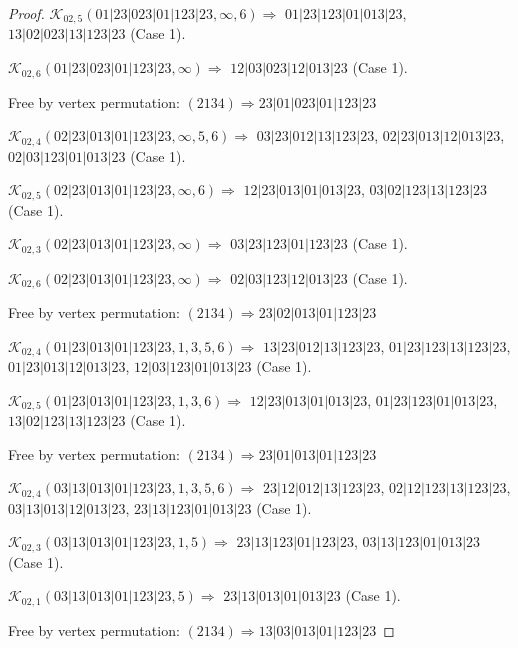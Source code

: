 \documentclass[12pt]{article}
\theoremstyle{plain}
\theoremstyle{definition}
\theoremstyle{remark}
\newcommand{\fancy}[1]{\mathcal{#1}}
\def\K{\fancy{K}}
\begin{document}
\begin{proof}
	$\K_{02,5}(01|23|023|01|123|23,\infty,6)\Rightarrow $ $01|23|123|01|013|23$, $13|02|023|13|123|23$ (Case 1).
	
	$\K_{02,6}(01|23|023|01|123|23,\infty)\Rightarrow $ $12|03|023|12|013|23$ (Case 1).
	
	
	
	Free by vertex permutation: $(2 1 3 4)\Rightarrow 23|01|023|01|123|23$
	
	
	
	\bigskip
	
	$\K_{02,4}(02|23|013|01|123|23,\infty,5, 6)\Rightarrow $ $03|23|012|13|123|23$, $02|23|013|12|013|23$, $02|03|123|01|013|23$ (Case 1).
	
	$\K_{02,5}(02|23|013|01|123|23,\infty,6)\Rightarrow $ $12|23|013|01|013|23$, $03|02|123|13|123|23$ (Case 1).
	
	$\K_{02,3}(02|23|013|01|123|23,\infty)\Rightarrow $ $03|23|123|01|123|23$ (Case 1).
	
	$\K_{02,6}(02|23|013|01|123|23,\infty)\Rightarrow $ $02|03|123|12|013|23$ (Case 1).
	
	
	
	Free by vertex permutation: $(2 1 3 4)\Rightarrow 23|02|013|01|123|23$
	
	
	
	\bigskip
	
	$\K_{02,4}(01|23|013|01|123|23,1, 3, 5, 6)\Rightarrow $ $13|23|012|13|123|23$, $01|23|123|13|123|23$, $01|23|013|12|013|23$, $12|03|123|01|013|23$ (Case 1).
	
	$\K_{02,5}(01|23|013|01|123|23,1, 3, 6)\Rightarrow $ $12|23|013|01|013|23$, $01|23|123|01|013|23$, $13|02|123|13|123|23$ (Case 1).
	
	
	
	Free by vertex permutation: $(2 1 3 4)\Rightarrow 23|01|013|01|123|23$
	
	
	
	\bigskip
	
	$\K_{02,4}(03|13|013|01|123|23,1, 3, 5, 6)\Rightarrow $ $23|12|012|13|123|23$, $02|12|123|13|123|23$, $03|13|013|12|013|23$, $23|13|123|01|013|23$ (Case 1).
	
	$\K_{02,3}(03|13|013|01|123|23,1, 5)\Rightarrow $ $23|13|123|01|123|23$, $03|13|123|01|013|23$ (Case 1).
	
	$\K_{02,1}(03|13|013|01|123|23,5)\Rightarrow $ $23|13|013|01|013|23$ (Case 1).
	
	
	
	Free by vertex permutation: $(2 1 3 4)\Rightarrow 13|03|013|01|123|23$
	

\end{proof}
\end{document}

